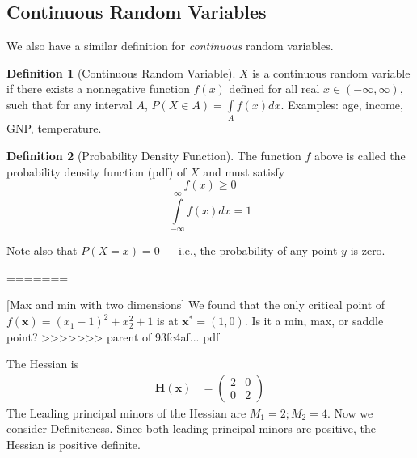 \documentclass[]{book}
\theoremstyle{definition}
\newtheorem{definition}{Definition}[chapter]
\theoremstyle{definition}
\theoremstyle{definition}
\theoremstyle{remark}
\begin{document}
\hypertarget{continuous-random-variables}{%
\subsection*{Continuous Random Variables}\label{continuous-random-variables}}

We also have a similar definition for \emph{continuous} random variables.

\begin{definition}[Continuous Random Variable]
\protect\hypertarget{def:unnamed-chunk-78}{}{\label{def:unnamed-chunk-78} {} }
\(X\) is a continuous random variable if there exists a nonnegative function \(f(x)\) defined for all real \(x\in (-\infty,\infty)\), such that for any interval \(A\), \(P(X\in A)=\int\limits_A f(x)dx\). Examples: age, income, GNP, temperature.
\end{definition}

\begin{definition}[Probability Density Function]
\protect\hypertarget{def:unnamed-chunk-79}{}{\label{def:unnamed-chunk-79} {} }
The function \(f\) above is called the probability density function (pdf) of \(X\) and must satisfy
\[f(x)\ge 0\]
\[\int\limits_{-\infty}^\infty f(x)dx=1\]

Note also that \(P(X = x)=0\) --- i.e., the probability of any point \(y\) is zero.
\end{definition}

=======

[Max and min with two dimensions]
\protect\hypertarget{exm:unnamed-chunk-57}{}{\label{exm:unnamed-chunk-57} {} }
We found that the only critical point of
\(f(\mathbf{x})=(x_1-1)^2+x_2^2+1\) is at \(\mathbf{x}^*=(1,0)\). Is it a min, max, or
saddle point?
>>>>>>> parent of 93fc4af... pdf

{}
The Hessian is
\begin{align*}
\mathbf{H(x)} &= \begin{pmatrix} 2&0\\0&2 \end{pmatrix}
\end{align*}
The Leading principal minors of the Hessian are \(M_1=2; M_2=4\). Now we consider Definiteness. Since both leading principal minors are positive, the Hessian is positive definite.
\end{document}
